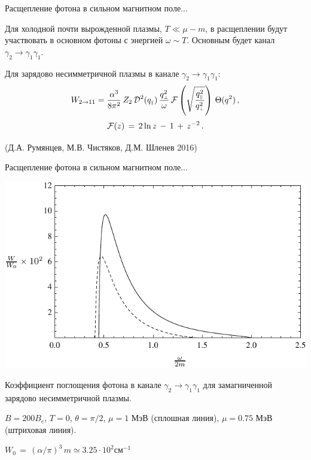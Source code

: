 \documentclass{beamer}
\def\mprp{\mbox{\tiny $\bot$}}
\def\mprl{\mbox{\tiny $\|$}}
\begin{document}
\begin{frame}{Расщепление фотона в сильном магнитном поле...}
\begin{center}
Для холодной почти вырожденной плазмы, $T\ll \mu-m$, в расщеплении будут участвовать в основном фотоны с 
энергией $\omega\sim T$. Основным будет канал $\gamma_2\to\gamma_1 \gamma_1$.
\vspace{3mm}

Для зарядово несимметричной плазмы в канале $\gamma_2\to \gamma_1 \gamma_1$:
$$W_{2 \to 11} = \frac{\alpha^3}{8\pi^2}\, Z_2\,  {\cal
D}^2(q_{\mprl}) \, \frac{q_{\mprp}^2}{\omega} \, {\cal F}\left
(\sqrt{\frac{q_{\mprl}^2}{q_{\mprp}^2}} \right) \, \Theta (q^2)\, ,$$
$${\cal F}(z) \, = \, 2 \ln{z} \, - \, 1 \, + \, z^{-2} \, .$$

\vspace{3mm}

(Д.А. Румянцев, М.В. Чистяков, Д.М. Шленев 2016)
\end{center}
\end{frame}
\begin{frame}{Расщепление фотона в сильном магнитном поле...}
\begin{center}

\includegraphics[scale=0.7]{3_3.pdf}

Коэффициент поглощения фотона в канале $\gamma_2 \to\gamma_1 \gamma_1$ для замагниченной зарядово несимметричной плазмы.

$B = 200B_e$, $T=0$, $\theta = \pi/2$,
$\mu =1$ МэВ (сплошная линия), $\mu = 0.75$ МэВ (штриховая линия).

$W_0 \, = \, (\alpha/\pi)^3\, m
\simeq 3.25\cdot 10^2 \mbox{см}^{-1}$

\end{center}
\end{frame}
\end{document}

